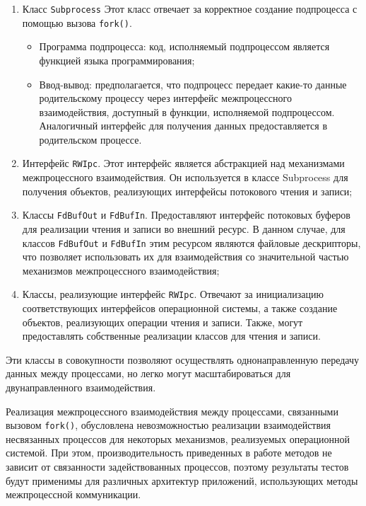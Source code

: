 \documentclass[14pt, russian]{scrartcl}
\begin{document}
\begin{enumerate}
  \item{Класс \verb|Subprocess|
    Этот класс отвечает за корректное создание подпроцесса с помощью вызова \verb|fork()|.
    \begin{itemize}
      \item{Программа подпроцесса: код, исполняемый подпроцессом является
            функцией языка программирования;}
      \item{Ввод-вывод: предполагается, что подпроцесс передает какие-то данные
            родительскому процессу через интерфейс межпроцессного
            взаимодействия, доступный в функции, исполняемой подпроцессом.
            Аналогичный интерфейс для получения данных предоставляется в
            родительском процессе.}
    \end{itemize}
  }
  \item{Интерфейс \verb|RWIpc|. Этот интерфейс является абстракцией над
    механизмами межпроцессного взаимодействия. Он используется в классе
    Subprocess для получения объектов, реализующих интерфейсы потокового
    чтения и записи; }
  \item{Классы \verb|FdBufOut| и \verb|FdBufIn|. Предоставляют интерфейс
        потоковых буферов для реализации чтения и записи во внешний ресурс. В
        данном случае, для классов \verb|FdBufOut| и \verb|FdBufIn| этим
        ресурсом являются файловые дескрипторы, что позволяет использовать их
        для взаимодействия со значительной частью механизмов межпроцессного
        взаимодействия; }
  \item{Классы, реализующие интерфейс \verb|RWIpc|. Отвечают за инициализацию
        соответствующих интерфейсов операционной системы, а также создание
        объектов, реализующих операции чтения и записи. Также, могут
        предоставлять собственные реализации классов для чтения и записи. }

\end{enumerate}

Эти классы в совокупности позволяют осуществлять однонаправленную передачу
данных между процессами, но легко могут масштабироваться для двунаправленного
взаимодействия.

Реализация межпроцессного взаимодействия между процессами, связанными вызовом
\verb|fork()|, обусловлена невозможностью реализации взаимодействия несвязанных
процессов для некоторых механизмов, реализуемых операционной системой. При этом,
производительность приведенных в работе методов не зависит от связанности
задействованных процессов, поэтому результаты тестов будут применимы для
различных архитектур приложений, использующих методы межпроцессной коммуникации.
\end{document}
